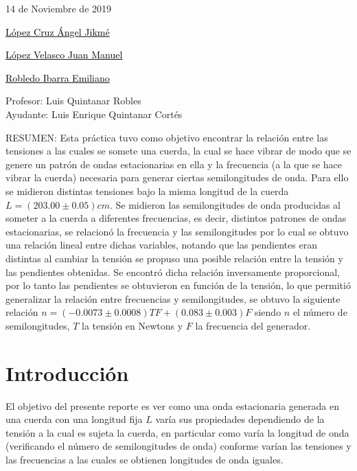 \documentclass[10pt,a4paper]{article}
\begin{document}
\vspace{.7 cm}
\begin{flushleft}{\Large 14 de Noviembre de 2019 }\\[1 cm]
\end{flushleft}
\begin{flushright}{\Large{\underline{\textcolor{black}{López Cruz Ángel Jikmé}}}}\\[0.78cm]
\end{flushright}
\begin{flushright}{\Large{\underline{\textcolor{black}{López Velasco Juan Manuel}}}}\\[0.78cm]

\begin{flushright}{\Large{\underline{\textcolor{black}{Robledo Ibarra Emiliano}}}}\\[1 cm]
\end{flushright}\end{flushright}
\begin{center}
{\Large Profesor: Luis Quintanar Robles }\\[0.4cm]
{\Large Ayudante: Luis Enrique Quintanar Cortés }\\[1 cm]
\end{center}
RESUMEN:
Esta práctica tuvo como objetivo encontrar la relación entre las tensiones a las cuales se somete una cuerda, la cual se hace vibrar de modo que se genere un patrón de ondas estacionarias en ella y la frecuencia (a la que se hace vibrar la cuerda) necesaria para generar ciertas semilongitudes de onda. Para ello se midieron distintas tensiones bajo la misma longitud de la cuerda $L= (203.00\pm0.05) cm$. Se midieron las semilongitudes de onda producidas al someter a la cuerda a diferentes frecuencias, es decir, distintos patrones de ondas estacionarias, se relacionó la frecuencia y las semilongitudes por lo cual se obtuvo una relación  lineal entre dichas variables, notando que las pendientes eran distintas al cambiar la tensión se propuso una posible relación entre la tensión y las pendientes obtenidas. Se encontró dicha relación inversamente proporcional, por lo tanto las pendientes se obtuvieron en función de la tensión, lo que permitió generalizar la relación entre frecuencias y semilongitudes, se obtuvo la siguiente relación $n=(-0.0073 \pm 0.0008)TF + (0.083 \pm 0.003)F$ siendo $n$ el número de semilongitudes, $T$ la tensión en Newtons y $F$ la frecuencia del generador.
\normalsize
\newpage


\section{Introducción}
El objetivo del presente reporte es ver como una onda estacionaria generada en una cuerda con una longitud fija $L$ varía sus propiedades dependiendo de la tensión a la cual es sujeta la cuerda, en particular como varía la longitud de onda (verificando el número de semilongitudes de onda) conforme varían las tensiones y las frecuencias a las cuales se obtienen longitudes de onda iguales.
\end{document}
